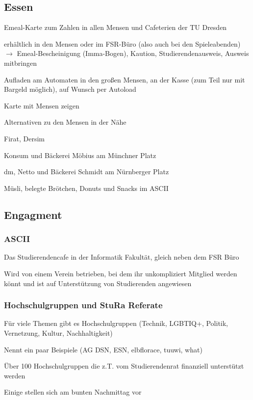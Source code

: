\documentclass[a4paper,12pt]{scrreprt}
\begin{document}
\subsection{Essen}
\begin{itemize*}
    \item Emeal-Karte zum Zahlen in allen Mensen und Cafeterien der TU Dresden
    \item erhältlich in den Mensen oder im FSR-Büro (also auch bei den Spieleabenden)
    $\rightarrow$ Emeal-Bescheinigung (Imma-Bogen),  Kaution, Studierendenausweis, Ausweis mitbringen
    \item Aufladen am Automaten in den großen Mensen, an der Kasse (zum Teil nur mit Bargeld möglich), auf Wunsch per Autoload
    \item Karte mit Mensen zeigen
    \item Alternativen zu den Mensen in der Nähe
    \begin{itemize*}
        \item Firat, Dersim
        \item Konsum und Bäckerei Möbius am Münchner Platz
        \item dm, Netto und Bäckerei Schmidt am Nürnberger Platz
        \item Müsli, belegte Brötchen, Donuts und Snacks im ASCII
    \end{itemize*}
\end{itemize*}

\subsection{Engagment}

\subsubsection{ASCII}
\begin{itemize*}
    \item Das Studierendencafe in der Informatik Fakultät, gleich neben dem FSR Büro
    \item Wird von einem Verein betrieben, bei dem ihr unkompliziert Mitglied werden könnt und ist auf Unterstützung von Studierenden angewiesen
\end{itemize*}

\subsubsection{Hochschulgruppen und StuRa Referate}
\begin{itemize*}
    \item Für viele Themen gibt es Hochschulgruppen (Technik, LGBTIQ+, Politik, Vernetzung, Kultur, Nachhaltigkeit)
    \item Nennt ein paar Beispiele (AG DSN, ESN, elbflorace, tuuwi, what)
    \item Über 100 Hochschulgruppen die z.T. vom Studierendenrat finanziell unterstützt werden
    \item Einige stellen sich am bunten Nachmittag vor
\end{itemize*}
\end{document}
